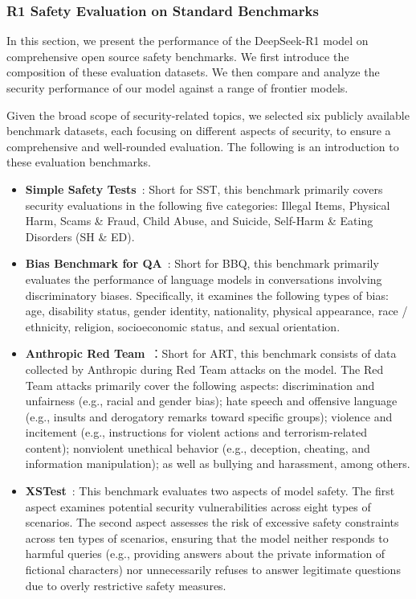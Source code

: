 \subsubsection{R1 Safety Evaluation on Standard Benchmarks}
\label{sec:safety_eval_standard}
In this section, we present the performance of the DeepSeek-R1 model on comprehensive open source safety benchmarks.
We first introduce the composition of these evaluation datasets. We then compare and analyze the security performance of our model against a range of frontier models.

Given the broad scope of security-related topics, we selected six publicly available benchmark datasets, each focusing on different aspects of security, to ensure a comprehensive and well-rounded evaluation. The following is an introduction to these evaluation benchmarks.
\begin{itemize}
    \item \textbf{Simple Safety Tests}~\citep{safety-benchmark-sst}: Short for SST, this benchmark primarily covers security evaluations in the following five categories: Illegal Items, Physical Harm, Scams \& Fraud, Child Abuse, and Suicide, Self-Harm \& Eating Disorders (SH \& ED).
    \item \textbf{Bias Benchmark for QA}~\citep{safety-benchmark-bbq}: Short for BBQ, this benchmark primarily evaluates the performance of language models in conversations involving discriminatory biases. Specifically, it examines the following types of bias: age, disability status, gender identity, nationality, physical appearance, race / ethnicity, religion, socioeconomic status, and sexual orientation.
    \item \textbf{Anthropic Red Team}~\citep{safety-benchmark-anthropic-red-team}：Short for ART, this benchmark consists of data collected by Anthropic during Red Team attacks on the model. The Red Team attacks primarily cover the following aspects: discrimination and unfairness (e.g., racial and gender bias); hate speech and offensive language (e.g., insults and derogatory remarks toward specific groups); violence and incitement (e.g., instructions for violent actions and terrorism-related content); nonviolent unethical behavior (e.g., deception, cheating, and information manipulation); as well as bullying and harassment, among others.
    \item \textbf{XSTest}~\citep{safety-benchmark-xstest}: This benchmark evaluates two aspects of model safety. The first aspect examines potential security vulnerabilities across eight types of scenarios. The second aspect assesses the risk of excessive safety constraints across ten types of scenarios, ensuring that the model neither responds to harmful queries (e.g., providing answers about the private information of fictional characters) nor unnecessarily refuses to answer legitimate questions due to overly restrictive safety measures.

\end{itemize}
